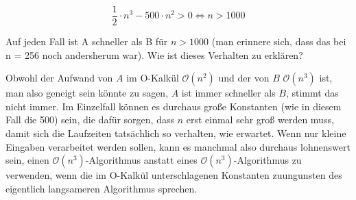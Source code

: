 \documentclass{bschlangaul-aufgabe}
\begin{document}
\begin{enumerate}
\begin{bAntwort}
\begin{displaymath}
\frac{1}{2} \cdot n^3 - 500 \cdot n^2 > 0 \Leftrightarrow n > 1000
\end{displaymath}

Auf jeden Fall ist A schneller als B für $n > 1000$ (man erinnere sich,
dass das bei n = 256 noch andersherum war). Wie ist dieses Verhalten zu
erklären?

Obwohl der Aufwand von $A$ im O-Kalkül $\mathcal{O}(n^2)$ und der von
$B$ $\mathcal{O}(n^3)$ ist, man also geneigt sein könnte zu sagen, $A$
ist immer schneller als $B$, stimmt das nicht immer. Im Einzelfall
können es durchaus große Konstanten (wie in diesem Fall die 500) sein,
die dafür sorgen, dass $n$ erst einmal sehr groß werden muss, damit sich
die Laufzeiten tatsächlich so verhalten, wie erwartet. Wenn nur kleine
Eingaben verarbeitet werden sollen, kann es manchmal also durchaus
lohnenswert sein, einen $\mathcal{O}(n^3)$-Algorithmus anstatt eines
$\mathcal{O}(n^3)$-Algorithmus zu verwenden, wenn die im O-Kalkül
unterschlagenen Konstanten zuungunsten des eigentlich langsameren
Algorithmus sprechen.
\end{bAntwort}

\end{enumerate}
\end{document}
